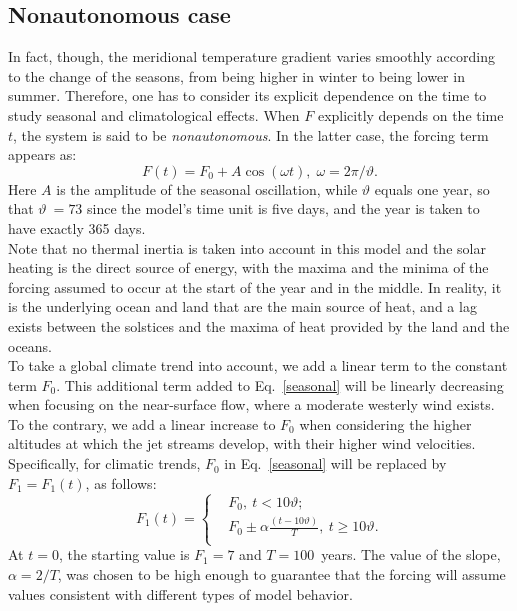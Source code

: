 \documentclass[%
 aip, cha,
 amsmath,amssymb,
 reprint,%
author-year,%
]{revtex4-1}
\newcommand{\0}{\mathbf 0}
\begin{document}
\subsection{Nonautonomous case} \label{ssec:nonauto}
In fact, though, the meridional temperature gradient varies smoothly according to the change of the seasons, from being higher in winter to being lower in summer.  
Therefore, one has to consider its explicit dependence on the time to study seasonal and climatological effects. When $F$ explicitly depends on the time $t$, the system is said to be {\em nonautonomous}. In the latter case, the forcing term appears as:
\begin{equation}\label{seasonal}
    F(t)=F_0 + A \cos(\omega t), \; \omega = {2\pi}/{\vartheta}.
\end{equation}
Here $A$ is the amplitude of the seasonal oscillation, while $\vartheta$ equals one year, so that $\vartheta \ = 73$ since the model's time unit is five days, and the year is taken to have exactly 365 days.\\ 
Note that no thermal inertia is taken into account in this model and the solar heating is the direct source of energy, with the maxima and the minima of the forcing assumed to occur at the start of the year and in the middle. 
In reality, it is the underlying ocean and land that are the main source of heat, and a lag exists between the solstices and the maxima of heat provided by the land and the oceans. \\
To take a global climate trend into account, we add a linear term to the constant term $F_0$. This additional term added to Eq.~\eqref{seasonal} will be linearly decreasing when focusing on the near-surface flow, where a moderate westerly wind exists. To the contrary, we add a linear increase to $F_0$ when considering the higher altitudes at which the jet streams develop, with their higher wind velocities. \\
Specifically, for climatic trends, $F_0$ in Eq.~\eqref{seasonal} will be replaced by $F_1 = F_1(t)$, as follows:
\begin{equation} \label{F(t)}
    F_1(t)=
    \left\{
\begin{aligned}
    & F_0 ,\ t < 10 \vartheta; \\
    & F_0 \pm \alpha \frac{(t-10 \vartheta)}{T},\ t \ge 10 \vartheta. \\
\end{aligned}
\right.
\end{equation}
At $t=0$, the starting value is ${F_1}=7$ and $T=100$~years. The value of the slope, $\alpha = 2/T$, was chosen to be high enough to guarantee that the forcing will assume values consistent with different types of model behavior.
\end{document}
